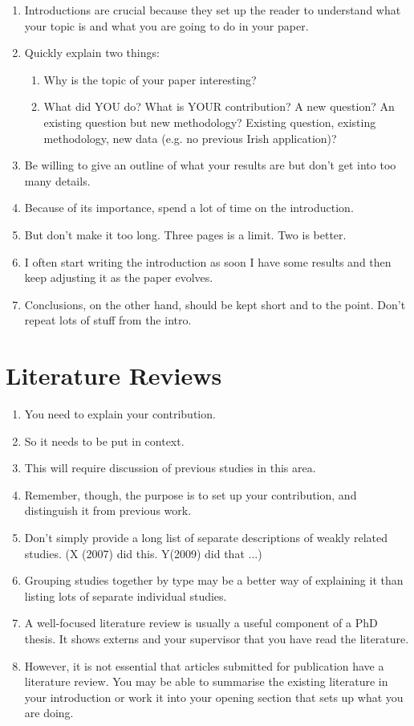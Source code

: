 \begin{enumerate}
	\item Introductions are crucial because they set up the reader to understand what your topic is and what you are going to do in your paper.
	\item Quickly explain two things:
	      \begin{enumerate}
		      \item Why is the topic of your paper interesting?
		      \item What did YOU do? What is YOUR contribution? A new question? An existing question but new methodology? Existing question, existing methodology, new data (e.g. no previous Irish application)?
	      \end{enumerate}

	\item Be willing to give an outline of what your results are but don’t get into too many details.
	\item Because of its importance, spend a lot of time on the introduction.
	\item But don’t make it too long. Three pages is a limit. Two is better.
	\item I often start writing the introduction as soon I have some results and then keep adjusting it as the paper evolves.
	\item Conclusions, on the other hand, should be kept short and to the point. Don’t repeat lots of stuff from the intro.
\end{enumerate}

\section{Literature Reviews}

\begin{enumerate}
	\item You need to explain your contribution.
	\item So it needs to be put in context.
	\item This will require discussion of previous studies in this area.
	\item Remember, though, the purpose is to set up your contribution, and distinguish it from previous work.
	\item Don’t simply provide a long list of separate descriptions of weakly related studies. (X (2007) did this. Y(2009) did that ...)
	\item Grouping studies together by type may be a better way of explaining it than listing lots of separate individual studies.
	\item A well-focused literature review is usually a useful component of a PhD thesis. It shows externs and your supervisor that you have read the literature.
	\item However, it is not essential that articles submitted for publication have a literature review. You may be able to summarise the existing literature in your introduction or work it into your opening section that sets up what you are doing.
\end{enumerate}

